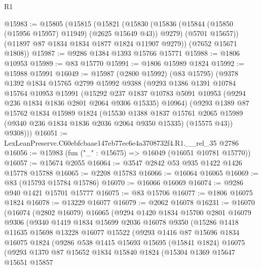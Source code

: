 \begin{lexlean}{R1}
\begin{coremodule}
@15983 := @15805
    (@15815
      (@15821
        (@15830
          (@15836 (@15844 (@15850 (@15956 @15957) @11949) (@2625 @15649 @43)) @9279)
          (@5701 @15657))
        (@11897 @87 @1834 @1834 @1877 @1824 @11907 @9279))
      (@7652 @15671 @1808))
@15987 := @9286 @1384 @1393 @15766 @15771
@15988 := @1806 @10953
@15989 := @83 @15770
@15991 := @1806 @15989 @1824
@15992 := @15988 @15991
@16049 := @15987
    (@2800 @15992)
    (@83 @15795)
    (@9378
      @1392
      @1834
      @15765
      @2799
      @15992
      @9388
      (@9293
        @1386
        @1391
        @10784
        @15764
        @10953
        @15991
        (@15292
          @237
          @1837
          @10783
          @5091
          @10953
          (@9294 @236 @1834 @1836 @2801 @2064 @9306 @15335)
          @10964)
        (@9293
          @1389
          @87
          @15762
          @1834
          @15989
          @1824
          (@15530
            @1388
            @1837
            @15761
            @2065
            @15989
            (@9340 @236 @1834 @1836 @2036 @2064 @9350 @15335)
            (@15575 @43))
          @9308)))
@16051 := LexLeanPreserve.C60ebfcbaae147eb77ec6e4a3708732f4.R1.__rel_35 @2786
@16056 := @15983 (fun ("_" : @15675) => @16049 (@16051 @10781 @15770))
@16057 := @15674 @2055
@16064 := @3547 @2842 @53 @935 @1422 @1426 @15778 @15788
@16065 := @2208 @15783
@16066 := @16064 @16065
@16069 := @83 (@15793 @15784 @15786)
@16070 := @16066 @16069
@16074 := @9286 @940 @1421 @15701 @15777
@16075 := @83 @15706
@16077 := @1806 @16075 @1824
@16078 := @13229 @16077
@16079 := @2062 @16078
@16231 := @16070
    (@16074
      (@2802 @16079)
      @16065
      (@9294
        @1420
        @1834
        @15700
        @2801
        @16079
        @9306
        (@9340
          @1419
          @1834
          @15699
          @2036
          @16078
          @9350
          (@15286
            @1418
            @11635
            @15698
            @13228
            @16077
            @15522
            (@9293
              @1416
              @87
              @15696
              @1834
              @16075
              @1824
              (@9286
                @538
                @1415
                @15693
                @15695
                (@15841 @1824)
                @16075
                (@9293
                  @1370
                  @87
                  @15652
                  @1834
                  @15840
                  @1824
                  (@15304
                    @1369
                    @15647
                    @15651
                    @15857

\end{coremodule}
\end{lexlean}
